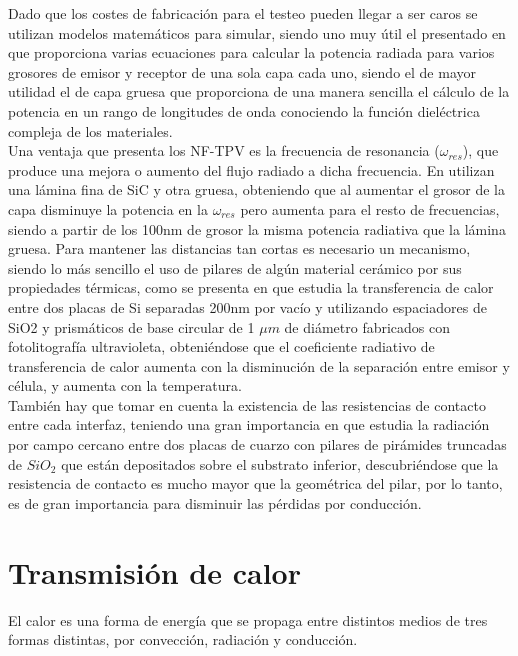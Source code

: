 Dado que los costes de fabricación para el testeo pueden llegar a ser caros se utilizan modelos matemáticos para simular, siendo uno muy útil el presentado en \cite{nfTPV_equations} que proporciona varias ecuaciones para calcular la potencia radiada para varios grosores de emisor y receptor de una sola capa cada uno, siendo el de mayor utilidad el de capa gruesa que proporciona de una manera sencilla el cálculo de la potencia en un rango de longitudes de onda conociendo la función dieléctrica compleja de los materiales.\\

Una ventaja que presenta los NF-TPV es la frecuencia de resonancia ($\omega_{res}$), que produce una mejora o aumento del flujo radiado a dicha frecuencia. En \cite{doi:Near_field_ThinFilm} utilizan una lámina fina de SiC y otra gruesa, obteniendo que al aumentar el grosor de la capa disminuye la potencia en la $\omega_{res}$ pero aumenta para el resto de frecuencias, siendo a partir de los 100nm de grosor la misma potencia radiativa que la lámina gruesa. Para mantener las distancias tan cortas es necesario un mecanismo, siendo lo más sencillo el uso de pilares de algún material cerámico por sus propiedades térmicas, como se presenta en \cite{NearField200} que estudia la transferencia de calor entre dos placas de Si separadas 200nm por vacío y utilizando espaciadores de SiO2 y prismáticos de base circular de 1 $\mu m$ de diámetro fabricados con fotolitografía ultravioleta, obteniéndose que el coeficiente radiativo de transferencia de calor aumenta con la disminución de la separación entre emisor y célula, y aumenta con la temperatura.\\

También hay que tomar en cuenta la existencia de las resistencias de contacto entre cada interfaz, teniendo una gran importancia en \cite{nf_TPV_Pillars_SiO2} que estudia la radiación por campo cercano entre dos placas de cuarzo con pilares de pirámides truncadas de $SiO_2$ que están depositados sobre el substrato inferior, descubriéndose que la resistencia de contacto es mucho mayor que la geométrica del pilar, por lo tanto, es de gran importancia para disminuir las pérdidas por conducción.\\


\section{Transmisión de calor}
El calor es una forma de energía que se propaga entre distintos medios de tres formas distintas, por convección, radiación y conducción.
